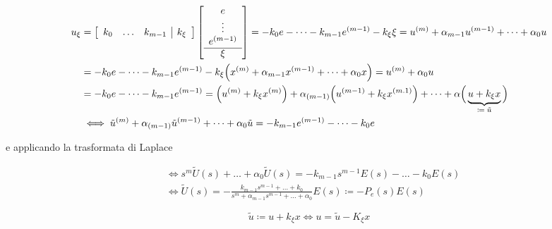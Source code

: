 	\begin{align*}
		u_{\xi} &=
		\left[
		\begin{array}{ccc|c}
			k_0 & \dots & k_{m-1} & k_{\xi}			
		\end{array}
		\right]	
		\left[
		\begin{array}{c}
			e         \\
			\vdots    \\
			e^{(m-1)} \\
			\cline{1-1}
			\xi
		\end{array}
		\right]
		=-k_0e-\dots-k_{m-1}e^{(m-1)}-k_{\xi}\xi=u^{(m)}+\alpha_{m-1}u^{(m-1)}+\dots+\alpha_0u \\
		&= -k_0e-\dots-k_{m-1}e^{(m-1)}-k_{\xi}\Big(x^{(m)}+\alpha_{m-1}x^{(m-1)}+\dots+\alpha_0x\Big)=u^{(m)}+\alpha_0u \\
		&= -k_0e-\dots-k_{m-1}e^{(m-1)}=\Big(u^{(m)}+k_{\xi}x^{(m)}\Big)+\alpha_{(m-1)}\Big(u^{(m-1)}+k_{\xi}x^{(m.1)}\Big)+\dots+\alpha\Big(\underbrace{u+k_{\xi}x}_\text{$\coloneqq\tilde{u}$}\Big) \\
		&\iff \tilde{u}^{(m)}+\alpha_{(m-1)}\tilde{u}^{(m-1)}+\dots+\alpha_0\tilde{u}=-k_{m-1}e^{(m-1)}-\dots-k_0e
	\end{align*} 
	
	\noindent e applicando la trasformata di Laplace
	
	\begin{align*}
		&\iff s^m\tilde{U}(s)+\dots+\alpha_0\tilde{U}(s)=-k_{m-1}s^{m-1}E(s)-\dots-k_0E(s) \\
		&\iff \tilde{U}(s)=-\frac{k_{m-1}s^{m-1}+\dots+k_0}{s^m+\alpha_{m-1}s^{m-1}+\dots+\alpha_0}E(s)\coloneqq-P_e(s)E(s)
	\end{align*}
	
	\begin{equation}
		\tilde{u}\coloneqq u+k_{\xi}x \iff u=\tilde{u}-K_{\xi}x
	\end{equation}
	
